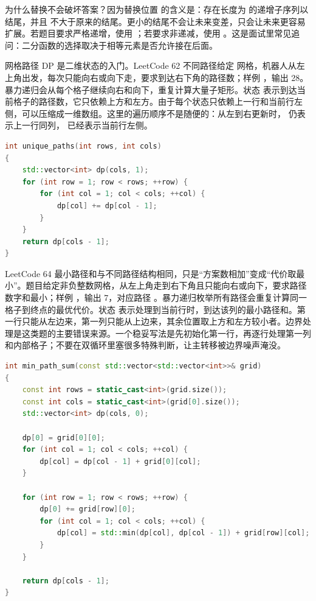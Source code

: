 为什么替换不会破坏答案？因为替换位置  的含义是：存在长度为  的递增子序列以  结尾，并且  不大于原来的结尾。更小的结尾不会让未来变差，只会让未来更容易扩展。若题目要求严格递增，使用 ；若要求非递减，使用 。这是面试里常见追问：二分函数的选择取决于相等元素是否允许接在后面。

网格路径 DP 是二维状态的入门。LeetCode 62 不同路径给定  网格，机器人从左上角出发，每次只能向右或向下走，要求到达右下角的路径数；样例 ，输出 28。暴力递归会从每个格子继续向右和向下，重复计算大量子矩形。状态  表示到达当前格子的路径数，它只依赖上方和左方。由于每个状态只依赖上一行和当前行左侧，可以压缩成一维数组。这里的遍历顺序不是随便的：从左到右更新时， 仍表示上一行同列， 已经表示当前行左侧。

\begin{lstlisting}[language=C++,caption={LeetCode 62 不同路径：一维滚动数组}]
int unique_paths(int rows, int cols)
{
    std::vector<int> dp(cols, 1);
    for (int row = 1; row < rows; ++row) {
        for (int col = 1; col < cols; ++col) {
            dp[col] += dp[col - 1];
        }
    }
    return dp[cols - 1];
}
\end{lstlisting}

LeetCode 64 最小路径和与不同路径结构相同，只是“方案数相加”变成“代价取最小”。题目给定非负整数网格，从左上角走到右下角且只能向右或向下，要求路径数字和最小；样例 ，输出 7，对应路径 。暴力递归枚举所有路径会重复计算同一格子到终点的最优代价。状态  表示处理到当前行时，到达该列的最小路径和。第一行只能从左边来，第一列只能从上边来，其余位置取上方和左方较小者。边界处理是这类题的主要错误来源。一个稳妥写法是先初始化第一行，再逐行处理第一列和内部格子；不要在双循环里塞很多特殊判断，让主转移被边界噪声淹没。

\begin{lstlisting}[language=C++,caption={LeetCode 64 最小路径和：边界初始化后主转移}]
int min_path_sum(const std::vector<std::vector<int>>& grid)
{
    const int rows = static_cast<int>(grid.size());
    const int cols = static_cast<int>(grid[0].size());
    std::vector<int> dp(cols, 0);

    dp[0] = grid[0][0];
    for (int col = 1; col < cols; ++col) {
        dp[col] = dp[col - 1] + grid[0][col];
    }

    for (int row = 1; row < rows; ++row) {
        dp[0] += grid[row][0];
        for (int col = 1; col < cols; ++col) {
            dp[col] = std::min(dp[col], dp[col - 1]) + grid[row][col];
        }
    }

    return dp[cols - 1];
}
\end{lstlisting}

